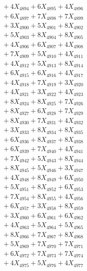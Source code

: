 \documentclass[a4paper,10pt]{article}
\begin{document}
{\begin{align}
&\;  + 4 X_{4894} + 6 X_{4895} + 4 X_{4896} \\[0.3ex]
&\;  + 6 X_{4897} + 7 X_{4898} + 7 X_{4899} \\[0.5ex]\allowbreak
&\;  + 3 X_{4900} + 5 X_{4901} + 8 X_{4902} \\[0.3ex]
&\;  + 5 X_{4903} + 8 X_{4904} + 8 X_{4905} \\[0.3ex]
&\;  + 4 X_{4906} + 6 X_{4907} + 4 X_{4908} \\[0.3ex]
&\;  + 7 X_{4909} + 5 X_{4910} + 4 X_{4911} \\[0.3ex]
&\;  + 4 X_{4912} + 5 X_{4913} + 8 X_{4914} \\[0.3ex]
&\;  + 6 X_{4915} + 6 X_{4916} + 4 X_{4917} \\[0.3ex]
&\;  + 4 X_{4918} + 7 X_{4919} + 3 X_{4920} \\[0.3ex]
&\;  + 4 X_{4921} + 3 X_{4922} + 4 X_{4923} \\[0.3ex]
&\;  + 8 X_{4924} + 8 X_{4925} + 7 X_{4926} \\[0.3ex]
&\;  + 8 X_{4927} + 6 X_{4928} + 7 X_{4929} \\[0.5ex]\allowbreak
&\;  + 8 X_{4930} + 7 X_{4931} + 4 X_{4932} \\[0.3ex]
&\;  + 3 X_{4933} + 8 X_{4934} + 8 X_{4935} \\[0.3ex]
&\;  + 6 X_{4936} + 8 X_{4937} + 8 X_{4938} \\[0.3ex]
&\;  + 6 X_{4939} + 7 X_{4940} + 4 X_{4941} \\[0.3ex]
&\;  + 7 X_{4942} + 5 X_{4943} + 8 X_{4944} \\[0.3ex]
&\;  + 8 X_{4945} + 5 X_{4946} + 3 X_{4947} \\[0.3ex]
&\;  + 4 X_{4948} + 8 X_{4949} + 6 X_{4950} \\[0.3ex]
&\;  + 5 X_{4951} + 8 X_{4952} + 6 X_{4953} \\[0.3ex]
&\;  + 7 X_{4954} + 8 X_{4955} + 4 X_{4956} \\[0.3ex]
&\;  + 6 X_{4957} + 3 X_{4958} + 8 X_{4959} \\[0.5ex]\allowbreak
&\;  + 3 X_{4960} + 6 X_{4961} + 6 X_{4962} \\[0.3ex]
&\;  + 4 X_{4963} + 5 X_{4964} + 5 X_{4965} \\[0.3ex]
&\;  + 8 X_{4966} + 7 X_{4967} + 8 X_{4968} \\[0.3ex]
&\;  + 5 X_{4969} + 7 X_{4970} + 7 X_{4971} \\[0.3ex]
&\;  + 6 X_{4972} + 7 X_{4973} + 7 X_{4974} \\[0.3ex]
&\;  + 4 X_{4975} + 5 X_{4976} + 4 X_{4977} \\[0.3ex]

\end{align}}
\end{document}
